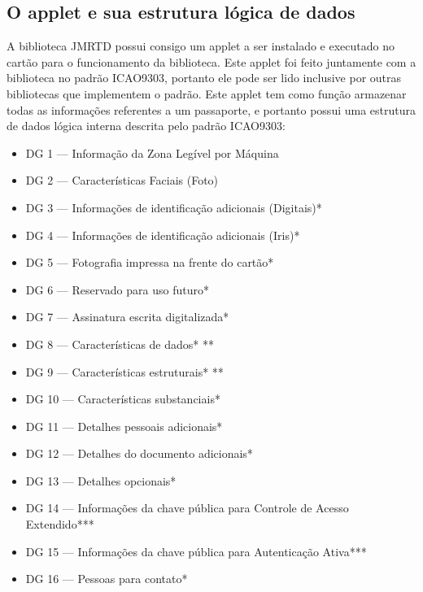 \documentclass[11pt]{article}
\begin{document}
			
		


	\subsection{O applet e sua estrutura lógica de dados}
		

		 A biblioteca JMRTD possui consigo um applet a ser instalado e executado no cartão para o funcionamento da biblioteca. Este applet foi feito juntamente com a biblioteca no padrão ICAO9303, portanto ele pode ser lido inclusive por outras bibliotecas que implementem o padrão. Este applet tem como função armazenar todas as informações referentes a um passaporte, e portanto possui uma estrutura de dados lógica interna descrita pelo padrão ICAO9303:
		
		\begin{itemize}

            \item DG 1 — Informação da Zona Legível por Máquina
            \item DG 2 — Características Faciais (Foto)
            \item DG 3 — Informações de identificação adicionais (Digitais)*
            \item DG 4 — Informações de identificação adicionais (Iris)*
            \item DG 5 — Fotografia impressa na frente do cartão*
            \item DG 6 — Reservado para uso futuro*
            \item DG 7 — Assinatura escrita digitalizada*
            \item DG 8 — Características de dados* **
            \item DG 9 — Características estruturais* **
            \item DG 10 — Características substanciais*
            \item DG 11 — Detalhes pessoais adicionais*
            \item DG 12 — Detalhes do documento adicionais*
            \item DG 13 — Detalhes opcionais*
            \item DG 14 — Informações da chave pública para Controle de Acesso Extendido***
            \item DG 15 — Informações da chave pública para Autenticação Ativa***
            \item DG 16 — Pessoas para contato*

		\end{itemize}
\end{document}
